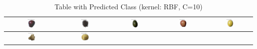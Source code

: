 \documentclass[a4paper,10 pt]{article}
\begin{document}
  \begin{table}[H]
    \centering
    \caption*{Table with Predicted Class (kernel: RBF, C=10)}
    \label{tab:images}
    \begin{tabular}{|c|c|c|c|c|}
        \hline
        \includegraphics[width=0.17\textwidth]{image1.png} &
        \includegraphics[width=0.17\textwidth]{image2.png} &
        \includegraphics[width=0.17\textwidth]{image4.png} &
        \includegraphics[width=0.17\textwidth]{image5.png} &
        \includegraphics[width=0.17\textwidth]{image3.png} \\
        \hline
        \includegraphics[width=0.17\textwidth]{image7.png} &
        \includegraphics[width=0.17\textwidth]{image6.png} &

\end{tabular}
\end{table}
\end{document}
